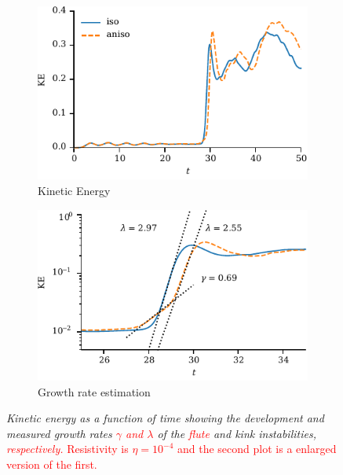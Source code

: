 \documentclass[12pt]{article}
\newcommand{\rs}[2]{\textcolor{red}{#2}}
\newcommand{\mycaption}[2]{\caption[#1]{\emph{#1} #2}}
\begin{document}
\begin{figure}[t]
  \centering
    \begin{subfigure}{0.49\textwidth}
      \includegraphics[width=\linewidth]{kinetic_energy-4.pdf}
      \caption{Kinetic Energy}
      \label{fig:kink_ke-4}
    \end{subfigure}
    \hfill
    \begin{subfigure}{0.49\textwidth}
      \includegraphics[width=\linewidth]{kinetic_energy_log-4.pdf}
      \caption{Growth rate estimation}
      \label{fig:kink_ke_log-4}
    \end{subfigure}
  \mycaption{Kinetic energy as a function of time showing the
    development and measured growth rates \rs{}{$\gamma$ and $\lambda$}
    of the \rs{fluting}{flute}
    and kink instabilities, \rs{}{respectively.}}{\rs{Both plots are from results
      where}{Resistivity is $\eta=10^{-4}$ and the second plot is a
      enlarged version of the first.}}
\label{fig:kink_str8_ke-4}%
\end{figure}
\end{document}
